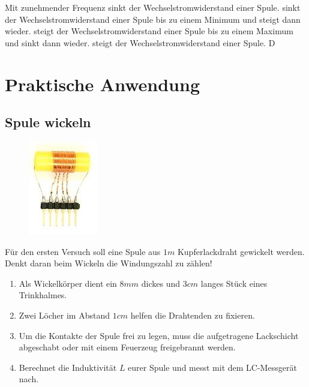 {Mit zunehmender Frequenz}%
{sinkt der Wechselstromwiderstand einer Spule.}%
{sinkt der Wechselstromwiderstand einer Spule
bis zu einem Minimum und steigt dann wieder.}%
{steigt der Wechselstromwiderstand einer Spule
bis zu einem Maximum und sinkt dann wieder.}%
{steigt der Wechselstromwiderstand einer Spule.}%
{D}%

\newpage

\section*{Praktische Anwendung}

\subsection*{Spule wickeln}

\begin{figure}
 \vspace{-10pt}
 \centering 
 \includegraphics[scale=4]{Spule/Bilder/Spule_bau.jpg}
 \vspace{-5pt}
\end{figure}


Für den ersten Versuch soll eine Spule aus $1 m$ Kupferlackdraht gewickelt
werden. Denkt daran beim Wickeln die Windungszahl zu zählen!

\begin{enumerate}
  \item Als Wickelkörper dient ein $8 mm$ dickes und $3cm$ langes Stück eines
    Trinkhalmes.
  \item Zwei Löcher im Abstand $1cm$ helfen die Drahtenden zu fixieren.
  \item Um die Kontakte der Spule frei zu legen, muss die aufgetragene
    Lackschicht abgeschabt oder mit einem Feuerzeug freigebrannt werden.
  \item Berechnet die Induktivität $L$ eurer Spule und messt mit dem
    LC-Messgerät nach.
\end{enumerate}

